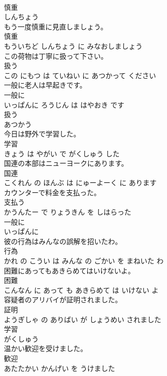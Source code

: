 \documentclass[8pt]{extreport}
\begin{document}
\begin{CJK}{UTF8}{min}
\\	慎重	
\\	しんちょう		
\\	もう一度慎重に見直しましょう。	
\\	慎重 
\\	もういちど しんちょう に みなおしましょう		
\\	この荷物は丁寧に扱って下さい。	
\\	扱う 
\\	この にもつ は ていねい に あつかって ください		
\\	一般に老人は早起きです。	
\\	一般に 
\\	いっぱんに ろうじん は はやおき です		
\\	扱う	
\\	あつかう		
\\	今日は野外で学習した。	
\\	学習 
\\	きょう は やがい で がくしゅう した		
\\	国連の本部はニューヨークにあります。	
\\	国連 
\\	こくれん の ほんぶ は にゅーよーく に あります		
\\	カウンターで料金を支払った。	
\\	支払う 
\\	かうんたー で りょうきん を しはらった		
\\	一般に	
\\	いっぱんに		
\\	彼の行為はみんなの誤解を招いたわ。	
\\	行為 
\\	かれ の こうい は みんな の ごかい を まねいた わ		
\\	困難にあってもあきらめてはいけないよ。	
\\	困難 
\\	こんなん に あって も あきらめて は いけない よ		
\\	容疑者のアリバイが証明されました。	
\\	証明 
\\	ようぎしゃ の ありばい が しょうめい されました		
\\	学習	
\\	がくしゅう		
\\	温かい歓迎を受けました。	
\\	歓迎 
\\	あたたかい かんげい を うけました		

\end{CJK}
\end{document}
